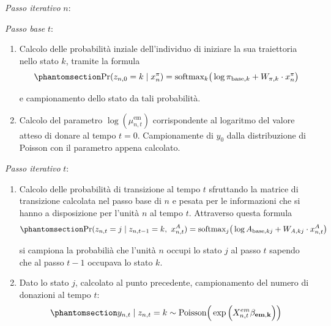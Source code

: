 \documentclass[
  italian,
  a4paper,
  a4paper,
  twoside,
  open=right,
  12pt]{scrbook}
\theoremstyle{definition}
\theoremstyle{remark}
\begin{document}
\emph{Passo iterativo} \(n\):

\emph{Passo base} \(t\):

\begin{enumerate}
\def\labelenumi{\arabic{enumi}.}
\setcounter{enumi}{2}
\item
  Calcolo delle probabilità inziale dell'individuo di iniziare la sua
  traiettoria nello stato \(k\), tramite la formula
  \begin{equation}\phantomsection\label{eq-prob_iniziali}{
  \Pr(z_{n,0}=k \mid x^\pi_n) =
  \text{softmax}_k \big( \log \pi_{\text{base},k} + W_{\pi,k} \cdot x^\pi_n \big)
  }\end{equation}

  e campionamento dello stato da tali probabilità.
\item
  Calcolo del parametro \(\log (\mu_{n,t}^{\text{em}})\) corrispondente
  al logaritmo del valore atteso di donare al tempo \(t=0\).
  Campionamente di \(y_0\) dalla distribuzione di Poisson con il
  parametro appena calcolato.
\end{enumerate}

\emph{Passo iterativo} \(t\):

\begin{enumerate}
\def\labelenumi{\arabic{enumi}.}
\setcounter{enumi}{4}
\item
  Calcolo delle probabilità di transizione al tempo \(t\) sfruttando la
  matrice di transizione calcolata nel passo base di \(n\) e pesata per
  le informazioni che si hanno a disposizione per l'unità \(n\) al tempo
  \(t\). Attraverso questa formula
  \begin{equation}\phantomsection\label{eq-trans_matrix}{
   \Pr(z_{n,t}=j \mid z_{n,t-1}=k, \ x^A_{n,t}) =
   \text{softmax}_j \big( \log A_{\text{base},kj} + W_{A,kj} \cdot x^A_{n,t} \big)
   }\end{equation}

  si campiona la probabilià che l'unità \(n\) occupi lo stato \(j\) al
  passo \(t\) sapendo che al passo \(t-1\) occupava lo stato \(k\).
\item
  Dato lo stato \(j\), calcolato al punto precedente, campionamento del
  numero di donazioni al tempo \(t\):
  \begin{equation}\phantomsection\label{eq-emissioni}{
   y_{n,t} \mid z_{n,t}=k \sim \text{Poisson}\Big(
     \exp\Big( X^{em}_{n,t} \mathbf{\beta_{em,k}}
     \Big)
   \Big)
   }\end{equation}
\end{enumerate}
\end{document}
